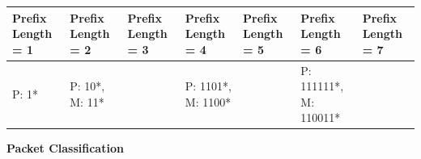 \documentclass[10pt]{article}
\newenvironment{problem}[2][]{\begin{trivlist}
\item[\hskip \labelsep {\bfseries #1}\hskip \labelsep {\bfseries #2.}]}{\end{trivlist}}
\begin{document}
\begin{problem}{7: Binary Search on Prefix Lengths}
\begin{table}[ht]
\begin{center}
\begin{tabular}{|p{2cm}|p{2cm}|p{2cm}|p{2cm}|p{2cm}|p{2cm}|p{2cm}|}
	\hline
	\textbf{Prefix Length = 1} & \textbf{Prefix Length = 2} & \textbf{Prefix Length = 3}& \textbf{Prefix Length = 4}& \textbf{Prefix Length = 5}& \textbf{Prefix Length = 6}&\textbf{Prefix Length = 7}\\
	\hline
    P: 1* & P: 10*, M: 11* & & P: 1101*, M: 1100* & & P: 111111*, M: 110011* &\\[40pt]
	\hline
	
\end{tabular}
\end{center}
\end{table}
\end{problem}
\newpage
\textbf{Packet Classification}
\end{document}

